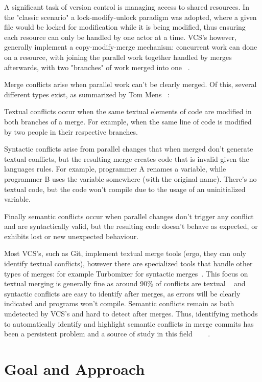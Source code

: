 A significant task of version control is managing access to shared resources.
In the "classic scenario" a lock-modify-unlock paradigm was adopted, where a given file would be locked for modification while it is being modified, thus ensuring each resource can only be handled by one actor at a time. VCS's however, generally implement a copy-modify-merge mechanism: concurrent work can done on a resource, with joining the parallel work together handled by merges afterwards, with two "branches" of work merged into one ~\citep{kn:vers_ott}.

Merge conflicts arise when parallel work can't be clearly merged. Of this, several different types exist, as summarized by Tom Mens ~\citep{kn:tmens}:

Textual conflicts occur when the same textual elements of code are modified in both branches of a merge. For example, when the same line of code is modified by two people in their respective branches.

Syntactic conflicts arise from parallel changes that when merged don't generate textual conflicts, but the resulting merge creates code that is invalid given the languages rules. For example, programmer A renames a variable, while programmer B uses the variable somewhere (with the original name). There's no textual code, but the code won't compile due to the usage of an uninitialized variable.

Finally semantic conflicts occur when parallel changes don't trigger any conflict and are syntactically valid, but the resulting code doesn't behave as expected, or exhibits lost or new unexpected behaviour.

Most VCS's, such as Git, implement textual merge tools (ergo, they can only identify textual conflicts), however there are specialized tools that handle other types of merges: for example Turbomixer for syntactic merges~\citep{kn:tmens}. This focus on textual merging is generally fine as around 90\% of conflicts are textual ~\citep{kn:lcsd} and syntactic conflicts are easy to identify after merges, as errors will be clearly indicated and programs won't compile.
Semantic conflicts remain as both undetected by VCS's and hard to detect after merges. Thus, identifying methods to automatically identify and highlight semantic conflicts in merge commits has been a persistent problem and a source of study in this field~\citep{kn:nuno} ~\citep{kn:leuson} ~\citep{kn:leuson2}.



\section{Goal and Approach} \label{sec:approach}

